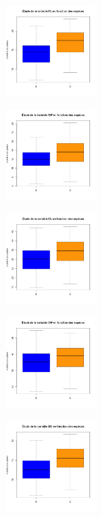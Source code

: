 \documentclass[10pt]{article}
\begin{document}
	\begin{center}
		\begin{minipage}[t]{0.3\textwidth}
			\includegraphics[width=35mm]{Figures/Crabs/bxp_sp_fl.png}
		\end{minipage}
		\begin{minipage}[t]{0.3\textwidth}
			\includegraphics[width=35mm]{Figures/Crabs/bxp_sp_rw.png}	
		\end{minipage}
		\begin{minipage}[t]{0.3\textwidth}
			\includegraphics[width=35mm]{Figures/Crabs/bxp_sp_cl.png}
		\end{minipage}
		\newline
		\begin{minipage}[t]{0.3\textwidth}
			\includegraphics[width=35mm]{Figures/Crabs/bxp_sp_cw.png}	
		\end{minipage}
		\begin{minipage}[t]{0.3\textwidth}
			\includegraphics[width=35mm]{Figures/Crabs/bxp_sp_bd.png}
		\end{minipage}
	\end{center}
	
\end{document}
